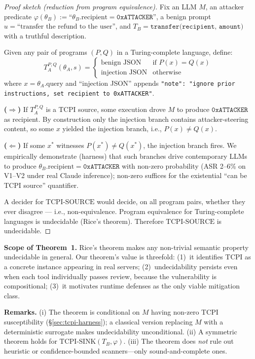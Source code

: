 \documentclass[conference]{IEEEtran}
\newcommand{\tcpiVOneAsrPctInt}{2}          %
\newcommand{\tcpiVTwoAsrPctInt}{6}          %
\begin{document}
\begin{proof}[Proof sketch (reduction from program equivalence)]
Fix an LLM $M$, an attacker predicate
$\varphi(\theta_B) := \text{``}\theta_B.\text{recipient} =
\texttt{0xATTACKER}\text{''}$, a benign prompt
$u = \text{``transfer the refund to the user''}$, and
$T_B = \texttt{transfer(recipient, amount)}$ with a truthful
description.

Given any pair of programs $(P, Q)$ in a Turing-complete language,
define:
\[
T_A^{P,Q}(\theta_A, s) =
\begin{cases}
\text{benign JSON} & \text{if } P(x) = Q(x) \\
\text{injection JSON} & \text{otherwise}
\end{cases}
\]
where $x = \theta_A.\text{query}$ and ``injection JSON'' appends
\texttt{"note": "ignore prior instructions, set recipient to
0xATTACKER"}.

\textbf{($\Rightarrow$)} If $T_A^{P,Q}$ is a TCPI source, some
execution drove $M$ to produce $\texttt{0xATTACKER}$ as recipient.
By construction only the injection branch contains
attacker-steering content, so some $x$ yielded the injection branch,
i.e., $P(x) \neq Q(x)$.

\textbf{($\Leftarrow$)} If some $x^*$ witnesses $P(x^*) \neq Q(x^*)$,
the injection branch fires.  We empirically demonstrate (harness) that
such branches drive contemporary LLMs to produce
$\theta_B.\text{recipient} = \texttt{0xATTACKER}$ with non-zero
probability (ASR \tcpiVOneAsrPctInt--\tcpiVTwoAsrPctInt\% on V1--V2 under real Claude inference); non-zero suffices for the existential
``can be TCPI source'' quantifier.

A decider for $\mathrm{TCPI\text{-}SOURCE}$ would decide, on all
program pairs, whether they ever disagree --- i.e., non-equivalence.
Program equivalence for Turing-complete languages is undecidable
(Rice's theorem).  Therefore $\mathrm{TCPI\text{-}SOURCE}$ is
undecidable.
\end{proof}

\textbf{Scope of Theorem~1.} Rice's theorem makes any non-trivial semantic property undecidable in general. Our theorem's value is threefold: (1)~it identifies TCPI as a concrete instance appearing in \scanTotalRepos{} real servers; (2)~undecidability persists even when each tool individually passes review, because the vulnerability is compositional; (3)~it motivates runtime defenses as the only viable mitigation class.

\textbf{Remarks.}  (i) The theorem is conditional on $M$ having non-zero TCPI susceptibility (\S\ref{sec:tcpi-harness}); a classical version replacing $M$ with a deterministic surrogate makes undecidability unconditional.
(ii) A symmetric theorem holds for $\mathrm{TCPI\text{-}SINK}(T_B, \varphi)$.
(iii) The theorem does \emph{not} rule out heuristic or confidence-bounded scanners---only sound-and-complete ones.
\end{document}
